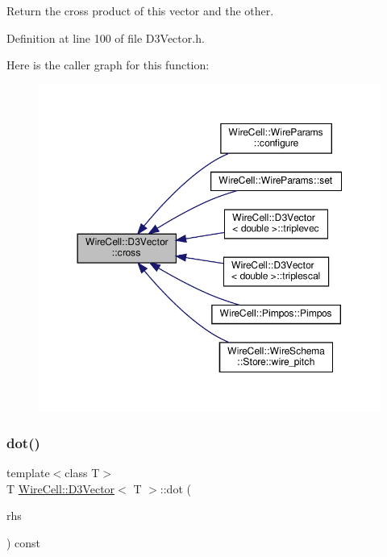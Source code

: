 Return the cross product of this vector and the other. 



Definition at line 100 of file D3\+Vector.\+h.

Here is the caller graph for this function\+:
\nopagebreak
\begin{figure}[H]
\begin{center}
\leavevmode
\includegraphics[width=350pt]{class_wire_cell_1_1_d3_vector_a23dc4ec801eb35c96d5843d1beed8bd2_icgraph}
\end{center}
\end{figure}
\mbox{\label{class_wire_cell_1_1_d3_vector_ad116deec8357b27dcad6be127c209490}} 
\subsubsection{\texorpdfstring{dot()}{dot()}}
{\footnotesize\ttfamily template$<$class T$>$ \\
T \hyperlink{class_wire_cell_1_1_d3_vector}{Wire\+Cell\+::\+D3\+Vector}$<$ T $>$\+::dot (\begin{DoxyParamCaption}\item[{const \hyperlink{class_wire_cell_1_1_d3_vector}{D3\+Vector}$<$ T $>$ \&}]{rhs }\end{DoxyParamCaption}) const\hspace{0.3cm}{\ttfamily [inline]}}



